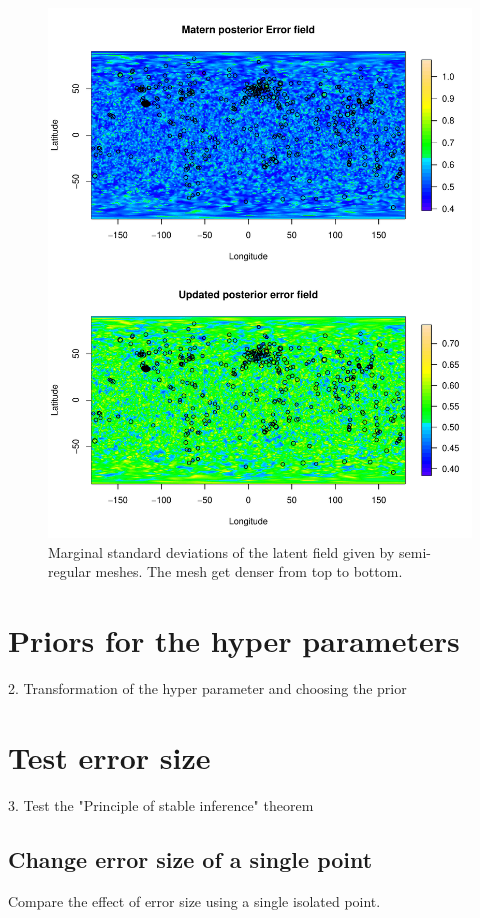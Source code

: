 \documentclass[a4paper,12pt]{article}
\begin{document}
\begin{figure}[htbp]
 \begin{center}
 \includegraphics[scale=0.8]{fig/irreg_lMeshGIA_error_field.pdf}
 \end{center}
 \caption[Semi-regular mesh]{Marginal standard deviations of the latent field given by semi-regular meshes. The mesh get denser from top to bottom.}
 \label{fig:mesh_comp_hyper}
 \end{figure}
 
\section{Priors for the hyper parameters}\label{sec:hyperpar}
2. Transformation of the hyper parameter and choosing the prior

\newpage
\section{Test error size}
3. Test the "Principle of stable inference" theorem 
\subsection{Change error size of a single point}
 Compare the effect of error size using a single isolated point.
 
\end{document}
